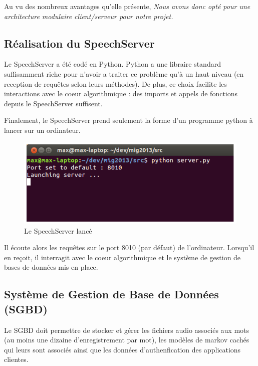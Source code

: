 \documentclass[a4paper,12pt]{report}
\begin{document}
Au vu des nombreux avantages qu'elle présente,
\emph{Nous avons donc opté pour une architecture modulaire client/serveur pour notre projet.}

\subsection{Réalisation du SpeechServer}

Le SpeechServer a été codé en Python. Python a une libraire standard suffisamment riche pour n'avoir a traiter ce problème qu'à un haut niveau (en reception de requêtes selon leurs méthodes). De plus, ce choix facilite les interactions avec le coeur algorithmique : des imports et appels de fonctions depuis le SpeechServer suffisent.

\medskip{}

Finalement, le SpeechServer prend seulement la forme d'un programme python à lancer sur un ordinateur.

\begin{figure}
	\begin{center}
	\includegraphics[width=14cm]{pics/server.png} 
	\end{center}
	\caption{Le SpeechServer lancé}
\end{figure}

Il écoute alors les requêtes sur le port 8010 (par défaut) de l'ordinateur. Lorsqu'il en reçoit, il interragit avec le coeur algorithmique et le système de gestion de bases de données mis en place.

\subsection{Système de Gestion de Base de Données (SGBD)}

Le SGBD doit permettre de stocker et gérer les fichiers audio associés aux mots (au moins une dizaine d'enregistrement par mot), les modèles de markov cachés qui leurs sont associés ainsi que les données d'authenfication des applications clientes.
\end{document}
